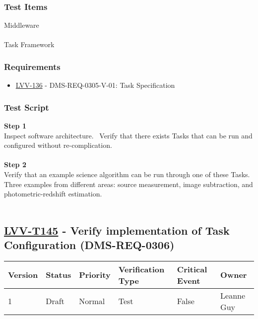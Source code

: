 \hypertarget{test-items-120}{%
\subsubsection{Test Items}\label{test-items-120}}

Middleware\\
~\\
Task Framework

\hypertarget{requirements-121}{%
\subsubsection{Requirements}\label{requirements-121}}

\begin{itemize}
\tightlist
\item
  \href{https://jira.lsstcorp.org/browse/LVV-136}{LVV-136} -
  DMS-REQ-0305-V-01: Task Specification
\end{itemize}

\hypertarget{test-script-121}{%
\subsubsection{Test Script}\label{test-script-121}}

\textbf{Step 1}\\
Inspect software architecture. ~Verify that there exists Tasks that can
be run and configured without re-complication.\\
~\\
\textbf{Step 2}\\
Verify that an example science algorithm can be run through one of these
Tasks.~ Three examples from different areas: source measurement, image
subtraction, and photometric-redshift estimation.\\
~\\

\hypertarget{lvv-t145---verify-implementation-of-task-configuration-dms-req-0306}{%
\subsection{\texorpdfstring{\href{https://jira.lsstcorp.org/secure/Tests.jspa\#/testCase/LVV-T145}{LVV-T145}
- Verify implementation of Task Configuration
(DMS-REQ-0306)}{LVV-T145 - Verify implementation of Task Configuration (DMS-REQ-0306)}}\label{lvv-t145---verify-implementation-of-task-configuration-dms-req-0306}}

\begin{longtable}[]{@{}llllll@{}}
\toprule
Version & Status & Priority & Verification Type & Critical Event &
Owner\tabularnewline
\midrule
\endhead
1 & Draft & Normal & Test & False & Leanne Guy\tabularnewline
\bottomrule
\end{longtable}

